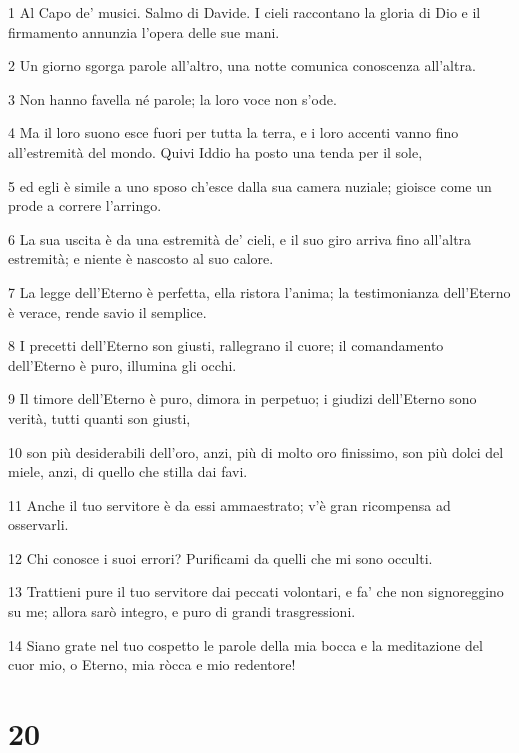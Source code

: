 \par 1 Al Capo de' musici. Salmo di Davide. I cieli raccontano la gloria di Dio e il firmamento annunzia l'opera delle sue mani.
\par 2 Un giorno sgorga parole all'altro, una notte comunica conoscenza all'altra.
\par 3 Non hanno favella né parole; la loro voce non s'ode.
\par 4 Ma il loro suono esce fuori per tutta la terra, e i loro accenti vanno fino all'estremità del mondo. Quivi Iddio ha posto una tenda per il sole,
\par 5 ed egli è simile a uno sposo ch'esce dalla sua camera nuziale; gioisce come un prode a correre l'arringo.
\par 6 La sua uscita è da una estremità de' cieli, e il suo giro arriva fino all'altra estremità; e niente è nascosto al suo calore.
\par 7 La legge dell'Eterno è perfetta, ella ristora l'anima; la testimonianza dell'Eterno è verace, rende savio il semplice.
\par 8 I precetti dell'Eterno son giusti, rallegrano il cuore; il comandamento dell'Eterno è puro, illumina gli occhi.
\par 9 Il timore dell'Eterno è puro, dimora in perpetuo; i giudizi dell'Eterno sono verità, tutti quanti son giusti,
\par 10 son più desiderabili dell'oro, anzi, più di molto oro finissimo, son più dolci del miele, anzi, di quello che stilla dai favi.
\par 11 Anche il tuo servitore è da essi ammaestrato; v'è gran ricompensa ad osservarli.
\par 12 Chi conosce i suoi errori? Purificami da quelli che mi sono occulti.
\par 13 Trattieni pure il tuo servitore dai peccati volontari, e fa' che non signoreggino su me; allora sarò integro, e puro di grandi trasgressioni.
\par 14 Siano grate nel tuo cospetto le parole della mia bocca e la meditazione del cuor mio, o Eterno, mia ròcca e mio redentore!

\chapter{20}

